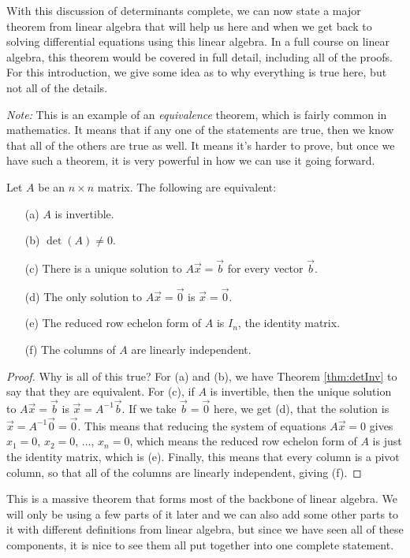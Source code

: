 With this discussion of determinants complete, we can now state a major theorem from linear algebra
that will help us here and when we get back to solving differential equations using this linear algebra. In a full course
on linear algebra, this theorem would be covered in full detail, including all of the proofs. For this introduction, we give some idea as to why everything is true here, but not all of the details.

\emph{Note:} This is an example of an \emph{equivalence} theorem, which is fairly common in mathematics. It means that if any one of the statements are true, then we know that all of the others are true as well. It means it's harder to prove, but once we have such a theorem, it is very powerful in how we can use it going forward.

\begin{theorem1}{}
Let $A$ be an $n \times n$ matrix. The following are equivalent:
\begin{enumerate}
\item[(a)] $A$ is invertible.
\item[(b)] $\det(A) \neq 0$.
\item[(c)] There is a unique solution to $A\vec{x} = \vec{b}$ for every vector $\vec{b}$.
\item[(d)] The only solution to $A\vec{x} = \vec{0}$ is $\vec{x} = \vec{0}$.
\item[(e)] The reduced row echelon form of $A$ is $I_n$, the identity matrix.
\item[(f)] The columns of $A$ are linearly independent.
\end{enumerate}
\end{theorem1}

\begin{proof}
Why is all of this true? For (a) and (b), we have Theorem \ref{thm:detInv} to say that they are equivalent. For (c), if $A$ is invertible, then the unique solution to $A\vec{x} = \vec{b}$ is $\vec{x} = A^{-1}\vec{b}$. If we take $\vec{b} = \vec{0}$ here, we get (d), that the solution is $\vec{x} = A^{-1}\vec{0} = \vec{0}$. This means that reducing the system of equations $A\vec{x} = 0$ gives $x_1 = 0$, $x_2 = 0$, ..., $x_n = 0$, which means the reduced row echelon form of $A$ is just the identity matrix, which is (e). Finally, this means that every column is a pivot column, so that all of the columns are linearly independent, giving (f).
\end{proof}

This is a massive theorem that forms most of the backbone of linear algebra. We will only be using a few parts of it later and we can also add some other parts to it with different definitions from linear algebra, but since we have seen all of these components, it is nice to see them all put together into one complete statement.

